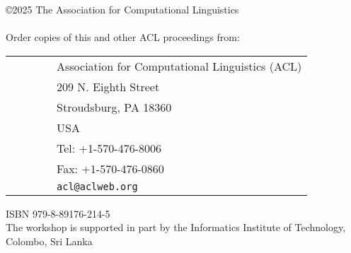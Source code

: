 \documentclass[11pt,a4paper]{article}
\begin{document}
\vfill
\large
\noindent
\copyright 2025 The Association for Computational Linguistics\\
\hspace*{6.5mm} \\

\vspace*{15mm}
\noindent Order copies of this and other ACL proceedings from: \\
\vspace*{3mm}

\begin{tabular}{ll}
\ \ \ \ \ \ & Association for Computational Linguistics (ACL)\\
& 209 N. Eighth Street\\
& Stroudsburg, PA 18360\\
& USA\\
& Tel: +1-570-476-8006\\
& Fax: +1-570-476-0860\\
&{\tt acl@aclweb.org}\\
\end{tabular}

\vspace*{6mm}
\noindent ISBN 979-8-89176-214-5 \\

The workshop is supported in part by the Informatics Institute of Technology, Colombo, Sri Lanka
\end{document}
